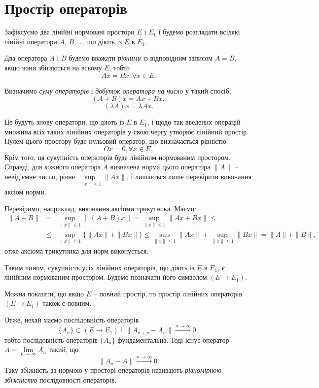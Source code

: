 \documentclass[14pt,twoside]{extreport}
\theoremstyle{mystyle}
\numberwithin{equation}{chapter}
\begin{document}
\section{Простір операторів}

Зафіксуємо два лінійні нормовані простори $E$ і $E_1$ і будемо розглядати всілякі лінійні оператори $A$, $B$, \ldots, що діють із $E$ в $E_1$.

Два оператора $A$ і $B$ будемо вважати \emph{рівними} із відповідним записом $A=B$, якщо вони збігаються на всьому $E$, тобто
\[
Ax=Bx, \forall x \in E.
\]

Визначимо \emph{суму операторів} і \emph{добуток оператора на число} у такий спосіб:
\[
(A+B)x= Ax + Bx,
\]
\[
(\lambda A)x=\lambda Ax.
\]

Це будуть знову оператори, що діють із $E$ в $E_1$, і щодо так введених операцій множина всіх таких лінійних операторів у свою чергу утворює лінійний простір. Нулем цього простору буде нульовий оператор, що визначається рівністю
\[
Ox=0, \forall x \in E,
\]
Крім того, ця сукупність операторів буде лінійним нормованим простором. Справді, для кожного оператора $A$ визначена норма цього оператора $\|A\|$ -- невід'ємне число, рівне $\sup\limits_{\|x\|\leqslant 1} \|Ax\|$, і лишається лише перевірити виконання аксіом норми.

Перевіримо, наприклад, виконання аксіоми трикутника. Маємо:
\[
\begin{array}{lll}
\|A+B\|&=&\displaystyle\sup_{\|x\| \leqslant 1} \|(A+B)x\| = \sup_{\|x\| \leqslant 1} \|Ax+Bx\|\leqslant\\
&\leqslant& \displaystyle\sup_{\|x\| \leqslant 1} \{\|Ax\| + \|Bx\|\}\leqslant \sup_{\|x\| \leqslant 1} \|Ax\| + \sup_{\|x\| \leqslant 1} \|Bx\| = \|A\| + \|B\|,
\end{array}
\]
отже аксіома трикутника для норм виконується.

Таким чином, сукупність усіх лінійних операторів, що діють із $E$ в $E_1$, є лінійним нормованим простором. Будемо позначати його символом $(E \to E_1)$.

Можна показати, що якщо $E$ -- повний простір, то простір лінійних операторів $(E \to E_1)$ також є повним.

Отже, нехай маємо послідовність операторів
\[
\{A_n\} \subset (E \to E_1)\textrm{ і }\|A_{n+p}-A_n\|\xrightarrow{n\to \infty} 0,
\]
тобто послідовність операторів $\{A_n\}$ фундаментальна. Тоді існує оператор $A = \lim\limits_{n\to\infty} A_n$ такий, що
\[
\|A_n - A\| \xrightarrow{n\to\infty} 0.
\]
Таку збіжність за нормою у просторі операторів називають \emph{рівномірною збіжністю} послідовності операторів.
\end{document}
